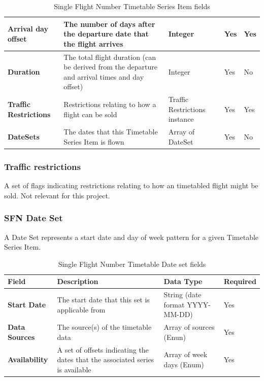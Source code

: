 \begin{table}[H]
\begin{tabular}{|p{2.5cm}|p{4cm}|p{2.5cm}|p{2cm}|p{1.2cm}|}
\textbf{Arrival day offset}              & The number of days after the departure date that the flight arrives                            & Integer                       & Yes               & Yes          \\ \hline
\textbf{Duration}                        & The total flight duration (can be derived from the departure and arrival times and day offset) & Integer                       & Yes               & No           \\ \hline
\textbf{Traffic Restrictions}            & Restrictions relating to how a flight can be sold                                              & Traffic Restrictions instance & Yes               & Yes          \\ \hline
\textbf{DateSets}                        & The dates that this Timetable Series Item is flown                                             & Array of DateSet              & Yes               & No           \\ \hline
\end{tabular}
\caption{Single Flight Number Timetable Series Item fields}
\label{sfn-series-item}
\end{table}

\subsubsection*{Traffic restrictions}

A set of flags indicating restrictions relating to how an timetabled flight might be sold. Not relevant for this project.

\subsubsection*{SFN Date Set} \label{sfn-date-set}

A Date Set represents a start date and day of week pattern for a given Timetable Series Item.

\begin{table}[H]
\centering
\begin{tabular}{|p{2.5cm}|p{4.7cm}|p{3cm}|p{2cm}|}
\hline
\textbf{Field}        & \textbf{Description}                                                          & \textbf{Data Type}              & \textbf{Required} \\ \hline
\textbf{Start Date}   & The start date that this set is applicable from                               & String (date format YYYY-MM-DD) & Yes               \\ \hline
\textbf{Data Sources} & The source(s) of the timetable data                                           & Array of sources (Enun)         & Yes               \\ \hline
\textbf{Availability} & A set of offsets indicating the dates that the associated series is available & Array of week days (Enum)       & Yes               \\ \hline
\end{tabular}
\caption{Single Flight Number Timetable Date set fields}
\label{sfn-date-set}
\end{table}

